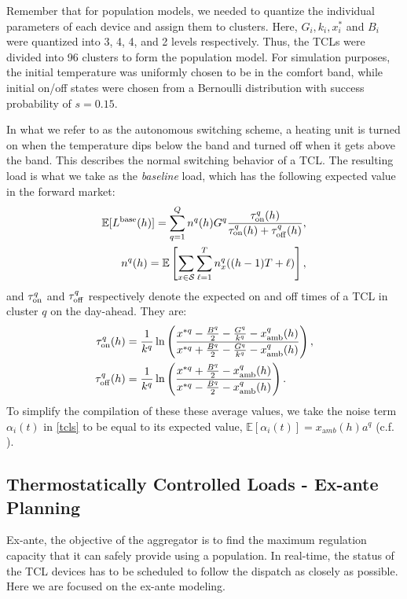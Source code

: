 \documentclass[10pt]{IEEEtran}
\begin{document}
Remember that for population models, we needed to quantize the individual parameters of each device and assign them to clusters.  Here, $G_i, k_i, x^*_i$ and $B_i$ were quantized into 3, 4, 4, and 2 levels respectively. Thus, the TCLs were divided into 96 clusters to form the population model. For simulation purposes, the initial temperature was uniformly chosen to be in the comfort band, while initial on/off states were chosen from a Bernoulli distribution with success probability of $s = 0.15$. 

In what we refer to
as the autonomous switching scheme, a heating unit is turned
on when the temperature dips below the band and turned
off when it gets above the band. This describes the normal switching behavior of a TCL. The resulting load is what we take as the {\it baseline} load, which has the following expected value in the forward market:
\begin{eqnarray}
{\mathbb E}[L^{\rm base}(h)] = \sum_{q=1}^Q n^q(h) G^q\frac{ \tau_{\rm on}^{q}(h)}{\tau_{\rm on}^{q}(h) + \tau_{\rm off}^{q}(h)},\\
n^q(h)={\mathbb E}\left[\sum_{x\in {\mathcal S}} \sum_{\ell=1}^T n^q_x((h-1)T + \ell)\right],
\end{eqnarray}
and
 $\tau_{\rm on}^{q}$ and $\tau_{\rm off}^{q}$ respectively denote the expected on and off times of a TCL in cluster $q$ on the day-ahead. They are:
 \begin{align}
 \tau_{\rm on}^{q}(h)&=\frac{1}{k^q} \ln\left(
\frac{x^{*q}-\frac{B^q} 2 -\frac{G^q}{k^q}-x_{\rm amb}^q(h)}
{x^{*q}+\frac{B^q} 2-\frac{G^q}{k^q}-x_{\rm amb}^q(h)}
\right),\\
 \tau_{\rm off}^{q}(h)&=\frac{1}{k^q} \ln\left(
\frac{x^{*q}+\frac{B^q} 2 -x_{\rm amb}^q(h)}
{x^{*q}-\frac{B^q} 2 -x_{\rm amb}^q(h)}
\right).
 \end{align} 
 To simplify the compilation of these these average values, we take the noise term $\alpha_i(t)$ in \eqref{tcls} to be equal to its expected value, ${\mathbb E}[\alpha_i(t)]= x_{{\mathrm amb}}(h) a^q $ (c.f. \cite{globalSIP}).

\subsection{Thermostatically Controlled Loads - Ex-ante Planning}\label{sec.TCLex-ante}\label{sec.capacity}
Ex-ante, the objective of the aggregator is to find the maximum regulation capacity that it can safely provide using a population. In real-time, the status of the TCL devices has to be scheduled to follow the dispatch as closely as possible. Here we are focused on the ex-ante modeling. 
\end{document}
